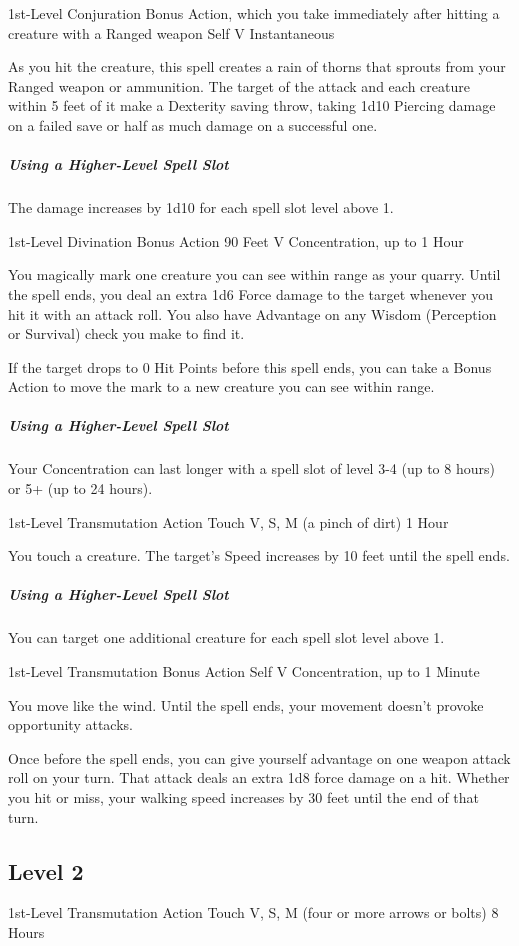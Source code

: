 \documentclass[letterpaper,openany,oneside,twocolumn]{book}
\begin{document}
	{1st-Level Conjuration}
	{Bonus Action, which you take immediately after hitting a creature with a Ranged weapon}
	{Self}
	{V}
	{Instantaneous}

As you hit the creature, this spell creates a rain of thorns that sprouts from your Ranged weapon or ammunition. The target of the attack and each creature within 5 feet of it make a Dexterity saving throw, taking 1d10 Piercing damage on a failed save or half as much damage on a successful one.

\subparagraph*{Using a Higher-Level Spell Slot} The damage increases by 1d10 for each spell slot level above 1.

	{1st-Level Divination}
	{Bonus Action}
	{90 Feet}
	{V}
	{Concentration, up to 1 Hour}

You magically mark one creature you can see within range as your quarry. Until the spell ends, you deal an extra 1d6 Force damage to the target whenever you hit it with an attack roll. You also have Advantage on any Wisdom (Perception or Survival) check you make to find it.

If the target drops to 0 Hit Points before this spell ends, you can take a Bonus Action to move the mark to a new creature you can see within range.

\subparagraph*{Using a Higher-Level Spell Slot} Your Concentration can last longer with a spell slot of level 3-4 (up to 8 hours) or 5+ (up to 24 hours).

	{1st-Level Transmutation}
	{Action}
	{Touch}
	{V, S, M (a pinch of dirt)}
	{1 Hour}

You touch a creature. The target's Speed increases by 10 feet until the spell ends.

\subparagraph*{Using a Higher-Level Spell Slot} You can target one additional creature for each spell slot level above 1.

	{1st-Level Transmutation}
	{Bonus Action}
	{Self}
	{V}
	{Concentration, up to 1 Minute}

You move like the wind. Until the spell ends, your movement doesn't provoke opportunity attacks.

Once before the spell ends, you can give yourself advantage on one weapon attack roll on your turn. That attack deals an extra 1d8 force damage on a hit. Whether you hit or miss, your walking speed increases by 30 feet until the end of that turn.

\subsection*{Level 2}
	{1st-Level Transmutation}
	{Action}
	{Touch}
	{V, S, M (four or more arrows or bolts)}
	{8 Hours}
\end{document}
